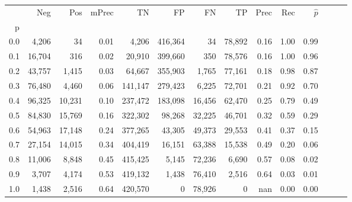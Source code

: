 \begin{tabular}{rrrrrrrrrrrrrr}
\toprule
{} &     Neg &     Pos & mPrec &       TN &       FP &      FN &      TP &  Prec &   Rec & $\hat{p}$ \\
p   &         &         &       &          &          &         &         &       &       &           \\
\midrule
0.0 &   4,206 &      34 &  0.01 &    4,206 &  416,364 &      34 &  78,892 &  0.16 &  1.00 &      0.99 \\
0.1 &  16,704 &     316 &  0.02 &   20,910 &  399,660 &     350 &  78,576 &  0.16 &  1.00 &      0.96 \\
0.2 &  43,757 &   1,415 &  0.03 &   64,667 &  355,903 &   1,765 &  77,161 &  0.18 &  0.98 &      0.87 \\
0.3 &  76,480 &   4,460 &  0.06 &  141,147 &  279,423 &   6,225 &  72,701 &  0.21 &  0.92 &      0.70 \\
0.4 &  96,325 &  10,231 &  0.10 &  237,472 &  183,098 &  16,456 &  62,470 &  0.25 &  0.79 &      0.49 \\
0.5 &  84,830 &  15,769 &  0.16 &  322,302 &   98,268 &  32,225 &  46,701 &  0.32 &  0.59 &      0.29 \\
0.6 &  54,963 &  17,148 &  0.24 &  377,265 &   43,305 &  49,373 &  29,553 &  0.41 &  0.37 &      0.15 \\
0.7 &  27,154 &  14,015 &  0.34 &  404,419 &   16,151 &  63,388 &  15,538 &  0.49 &  0.20 &      0.06 \\
0.8 &  11,006 &   8,848 &  0.45 &  415,425 &    5,145 &  72,236 &   6,690 &  0.57 &  0.08 &      0.02 \\
0.9 &   3,707 &   4,174 &  0.53 &  419,132 &    1,438 &  76,410 &   2,516 &  0.64 &  0.03 &      0.01 \\
1.0 &   1,438 &   2,516 &  0.64 &  420,570 &        0 &  78,926 &       0 &   nan &  0.00 &      0.00 \\
\bottomrule
\end{tabular}
